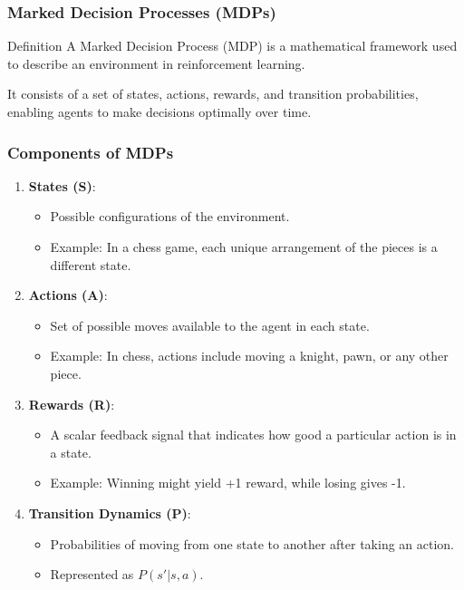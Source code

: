 \documentclass{beamer}
\begin{document}
\begin{frame}[fragile]
    \frametitle{Marked Decision Processes (MDPs)}
    \begin{block}{Definition}
        A Marked Decision Process (MDP) is a mathematical framework used to describe an environment in reinforcement learning. 
    \end{block}
    It consists of a set of states, actions, rewards, and transition probabilities, enabling agents to make decisions optimally over time.
\end{frame}

\begin{frame}[fragile]
    \frametitle{Components of MDPs}
    \begin{enumerate}
        \item \textbf{States (S)}:
        \begin{itemize}
            \item Possible configurations of the environment.
            \item Example: In a chess game, each unique arrangement of the pieces is a different state.
        \end{itemize}
        
        \item \textbf{Actions (A)}:
        \begin{itemize}
            \item Set of possible moves available to the agent in each state.
            \item Example: In chess, actions include moving a knight, pawn, or any other piece.
        \end{itemize}
        
        \item \textbf{Rewards (R)}:
        \begin{itemize}
            \item A scalar feedback signal that indicates how good a particular action is in a state.
            \item Example: Winning might yield +1 reward, while losing gives -1.
        \end{itemize}
        
        \item \textbf{Transition Dynamics (P)}:
        \begin{itemize}
            \item Probabilities of moving from one state to another after taking an action.
            \item Represented as $P(s'|s, a)$.
        \end{itemize}
    \end{enumerate}
\end{frame}
\end{document}
